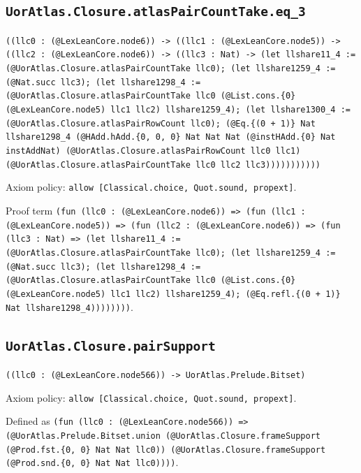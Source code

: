 \documentclass[11pt]{article}
\begin{document}
\subsection*{\texttt{UorAtlas.Closure.atlasPairCountTake.eq\_3}}
\noindent\texttt{((llc0 : (@LexLeanCore.node6)) -> ((llc1 : (@LexLeanCore.node5)) -> ((llc2 : (@LexLeanCore.node6)) -> ((llc3 : Nat) -> (let llshare11\_4 := (@UorAtlas.Closure.atlasPairCountTake llc0); (let llshare1259\_4 := (@Nat.succ llc3); (let llshare1298\_4 := (@UorAtlas.Closure.atlasPairCountTake llc0 (@List.cons.\{0\} (@LexLeanCore.node5) llc1 llc2) llshare1259\_4); (let llshare1300\_4 := (@UorAtlas.Closure.atlasPairRowCount llc0); (@Eq.\{(0 + 1)\} Nat llshare1298\_4 (@HAdd.hAdd.\{0, 0, 0\} Nat Nat Nat (@instHAdd.\{0\} Nat instAddNat) (@UorAtlas.Closure.atlasPairRowCount llc0 llc1) (@UorAtlas.Closure.atlasPairCountTake llc0 llc2 llc3)))))))))))}\par
\noindent Axiom policy: \texttt{allow [Classical.choice, Quot.sound, propext]}.\par
\noindent Proof term \texttt{(fun (llc0 : (@LexLeanCore.node6)) => (fun (llc1 : (@LexLeanCore.node5)) => (fun (llc2 : (@LexLeanCore.node6)) => (fun (llc3 : Nat) => (let llshare11\_4 := (@UorAtlas.Closure.atlasPairCountTake llc0); (let llshare1259\_4 := (@Nat.succ llc3); (let llshare1298\_4 := (@UorAtlas.Closure.atlasPairCountTake llc0 (@List.cons.\{0\} (@LexLeanCore.node5) llc1 llc2) llshare1259\_4); (@Eq.refl.\{(0 + 1)\} Nat llshare1298\_4))))))))}.\par
\subsection*{\texttt{UorAtlas.Closure.pairSupport}}
\noindent\texttt{((llc0 : (@LexLeanCore.node566)) -> UorAtlas.Prelude.Bitset)}\par
\noindent Axiom policy: \texttt{allow [Classical.choice, Quot.sound, propext]}.\par
\noindent Defined as \texttt{(fun (llc0 : (@LexLeanCore.node566)) => (@UorAtlas.Prelude.Bitset.union (@UorAtlas.Closure.frameSupport (@Prod.fst.\{0, 0\} Nat Nat llc0)) (@UorAtlas.Closure.frameSupport (@Prod.snd.\{0, 0\} Nat Nat llc0))))}.\par
\end{document}
